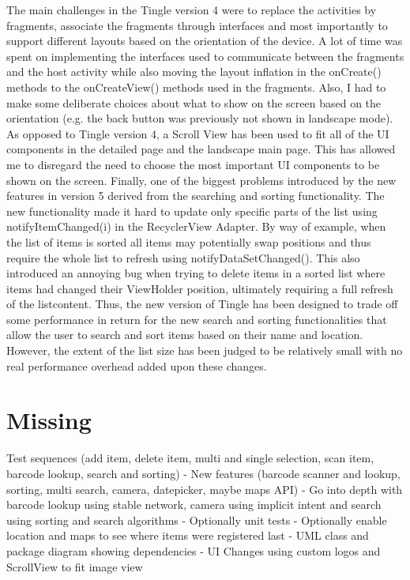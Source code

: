 \documentclass{article} %
\begin{document}

The main challenges in the Tingle version 4 were to replace the activities by fragments, associate the fragments through interfaces and most importantly to support different layouts based on the orientation of the device. A lot of time was spent on implementing the interfaces used to communicate between the fragments and the host activity while also moving the layout inflation in the onCreate() methods to the onCreateView() methods used in the fragments. Also, I had to make some deliberate choices about what to show on the screen based on the orientation (e.g. the back button was previously not shown in landscape mode). As opposed to Tingle version 4, a Scroll View has been used to fit all of the UI components in the detailed page and the landscape main page. This has allowed me to disregard the need to choose the most important UI components to be shown on the screen. Finally, one of the biggest problems introduced by the new features in version 5 derived from the searching and sorting functionality. The new functionality made it hard to update only specific parts of the list using notifyItemChanged(i) in the RecyclerView Adapter. By way of example, when the list of items is sorted all items may potentially swap positions and thus require the whole list to refresh using notifyDataSetChanged(). This also introduced an annoying bug when trying to delete items in a sorted list where items had changed their ViewHolder position, ultimately requiring a full refresh of the listcontent. Thus, the new version of Tingle has been designed to trade off some performance in return for the new search and sorting functionalities that allow the user to search and sort items based on their name and location. However, the extent of the list size has been judged to be relatively small with no real performance overhead added upon these changes. 

\iffalse

\section{Missing}
Test sequences (add item, delete item, multi and single selection, scan item, barcode lookup, search and sorting)
- New features (barcode scanner and lookup, sorting, multi search, camera, datepicker, maybe maps API)
- Go into depth with barcode lookup using stable network, camera using implicit intent and search using sorting and search algorithms 
- Optionally unit tests 
- Optionally enable location and maps to see where items were registered last 
- UML class and package diagram showing dependencies 
- UI Changes using custom logos and ScrollView to fit image view 
\end{document}
